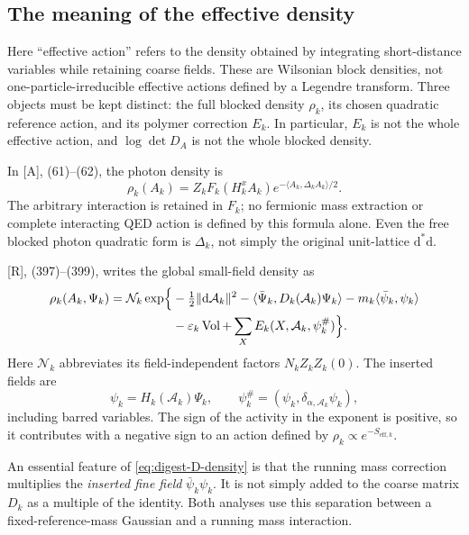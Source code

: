 \documentclass[11pt]{article}
\numberwithin{equation}{section}
\newcommand{\dd}{\mathrm d}
\newcommand{\Vol}{\operatorname{Vol}}
\newcommand{\AG}{\textup{[A]}}
\newcommand{\UR}{\textup{[R]}}
\begin{document}
\subsection{The meaning of the effective density}

Here ``effective action'' refers to the density obtained by integrating
short-distance variables while retaining coarse fields. These are
Wilsonian block densities, not one-particle-irreducible effective
actions defined by a Legendre transform. Three objects must be kept
distinct: the full blocked density $\rho_k$, its chosen quadratic
reference action, and its polymer correction $E_k$. In particular,
$E_k$ is not the whole effective action, and $\log\det D_A$ is not
the whole blocked density.

In \AG, (61)--(62), the photon density is
\begin{equation}
 \rho_k(A_k)=Z_k F_k(H_k^xA_k)
               e^{-\langle A_k,\Delta_kA_k\rangle/2}.
\end{equation}
The arbitrary interaction is retained in $F_k$; no fermionic mass
extraction or complete interacting QED action is defined by this
formula alone. Even the free blocked photon quadratic form is
$\Delta_k$, not simply the original unit-lattice $\dd^*\dd$.

\UR, (397)--(399), writes the global small-field density as
\begin{equation}
 \begin{aligned}
 \rho_k(A_k,\Psi_k)=\mathcal N_k\exp\Bigl\{
   &-\tfrac12\|\dd\mathcal A_k\|^2
    -\langle\bar\Psi_k,D_k(\mathcal A_k)\Psi_k\rangle
    -m_k\langle\bar\psi_k,\psi_k\rangle\\
   &-\varepsilon_k\Vol
    +\sum_X E_k(X,\mathcal A_k,\psi_k^\#)\Bigr\}.
 \end{aligned}
 \label{eq:digest-D-density}
\end{equation}
Here $\mathcal N_k$ abbreviates its field-independent factors
$N_kZ_kZ_k(0)$. The inserted fields are
\[
 \psi_k=H_k(\mathcal A_k)\Psi_k,\qquad
 \psi_k^\#=(\psi_k,\delta_{\alpha,\mathcal A_k}\psi_k),
\]
including barred variables. The sign of the activity in the exponent is positive,
so it contributes with a negative sign to an action defined by
$\rho_k\propto e^{-S_{\mathrm{eff},k}}$.

An essential feature of \eqref{eq:digest-D-density} is that the running
mass correction multiplies the \emph{inserted fine field}
$\bar\psi_k\psi_k$. It is not simply added to the coarse matrix
$D_k$ as a multiple of the identity. Both analyses use this
separation between a fixed-reference-mass Gaussian and a running
mass interaction.
\end{document}
